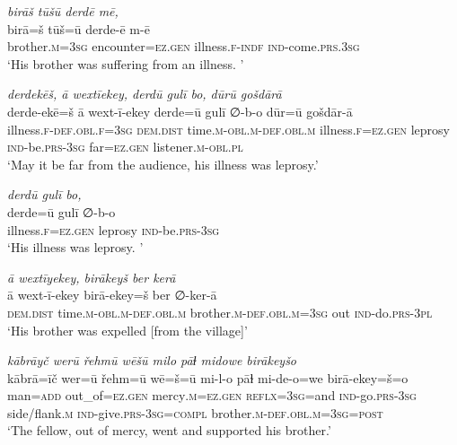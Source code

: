 \ea \label{DG.12}
\textit{birāš tūšū derdē mē,} \\ 
\gll birā=š tūš=ū derde-ē m-ē \\ 
 brother\textsc{.m}\textsc{=3sg} encounter\textsc{=ez}\textsc{.gen} illness\textsc{\textsc{.f}}\textsc{-indf} \textsc{ind-}come\textsc{.prs}\textsc{.3sg} \\ 
\glt `His brother was suffering from an illness.  '
\z 
 
\ea \label{DG.13}
\textit{derdekēš, ā wextīekey, derdū gulī bo, dūrū gošdārā} \\ 
\gll derde-ekē=š ā wext-ī-ekey derde=ū gulī ∅-b-o dūr=ū gošdār-ā \\ 
 illness\textsc{\textsc{.f}}\textsc{-def}\textsc{.obl}\textsc{\textsc{.f}}\textsc{=3sg} \textsc{dem.dist} time\textsc{.m}\textsc{-obl}\textsc{.m}\textsc{-def}\textsc{.obl}\textsc{.m} illness\textsc{\textsc{.f}}\textsc{=ez}\textsc{.gen} leprosy \textsc{ind-}be\textsc{.prs}\textsc{-3sg} far\textsc{=ez}\textsc{.gen} listener\textsc{.m}\textsc{-obl}\textsc{.pl} \\ 
\glt `May it be far from the audience, his illness was leprosy.'
\z 
 
\ea \label{DG.14}
\textit{derdū gulī bo,} \\ 
\gll derde=ū gulī ∅-b-o \\ 
 illness\textsc{\textsc{.f}}\textsc{=ez}\textsc{.gen} leprosy \textsc{ind-}be\textsc{.prs}\textsc{-3sg} \\ 
\glt `His illness was leprosy. '
\z 
 
\ea \label{DG.15}
\textit{ā wextīyekey, birākeyš ber kerā} \\ 
\gll ā wext-ī-ekey birā-ekey=š ber ∅-ker-ā \\ 
 \textsc{dem.dist} time\textsc{.m}\textsc{-obl}\textsc{.m}\textsc{-def}\textsc{.obl}\textsc{.m} brother\textsc{.m}\textsc{-def}\textsc{.obl}\textsc{.m}\textsc{=3sg} out \textsc{ind-}do\textsc{.prs}\textsc{-3pl} \\ 
\glt `His brother was expelled [from the village]'
\z 
 
\ea \label{DG.16}
\textit{kābrāyč werū řehmū wēšū milo pāɫ midowe birākeyšo} \\ 
\gll kābrā=īč wer=ū řehm=ū wē=š=ū mi-l-o pāɫ mi-de-o=we birā-ekey=š=o \\ 
 man\textsc{=add} out\_of\textsc{=ez}\textsc{.gen} mercy\textsc{.m}\textsc{=ez}\textsc{.gen} \textsc{reflx}\textsc{=3sg}=and \textsc{ind-}go\textsc{.prs}\textsc{-3sg} side/flank\textsc{.m} \textsc{ind-}give\textsc{.prs}\textsc{-3sg}\textsc{=\textsc{compl}} brother\textsc{.m}\textsc{-def}\textsc{.obl}\textsc{.m}\textsc{=3sg}\textsc{=\textsc{post}} \\ 
\glt `The fellow, out of mercy, went and supported his brother.'
\z 
 
